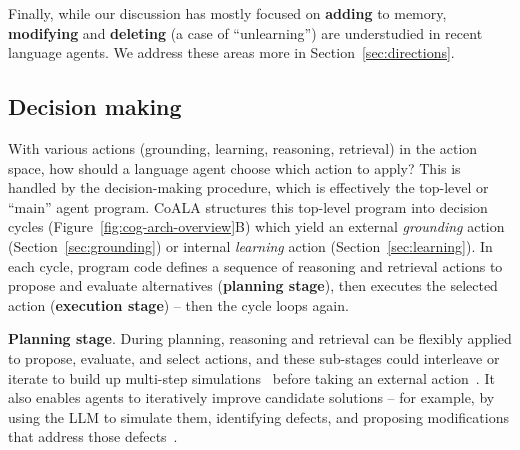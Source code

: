 \documentclass[10pt]{article} %
\begin{document}
Finally, while our discussion has mostly focused on \textbf{adding} to memory, \textbf{modifying} and \textbf{deleting} (a case of ``unlearning'') are understudied in recent language agents. We address these areas more in Section~\ref{sec:directions}. 

\subsection{Decision making}
\label{sec:decision}

With various actions (grounding, learning, reasoning, retrieval) in the action space, how should a language agent choose which action to apply?
This is handled by the decision-making procedure, which is effectively the top-level or ``main'' agent program. CoALA structures this top-level program into decision cycles (Figure~\ref{fig:cog-arch-overview}B) which yield an external \emph{grounding} action (Section~\ref{sec:grounding}) or internal \emph{learning} action (Section~\ref{sec:learning}). In each cycle, program code defines a sequence of reasoning and retrieval actions to propose and evaluate alternatives (\textbf{planning stage}), then executes the selected action (\textbf{execution stage}) -- then the cycle loops again.


\textbf{Planning stage}. During planning, reasoning and retrieval can be flexibly applied to propose, evaluate, and select actions, and these sub-stages could interleave or iterate to build up multi-step simulations~\citep{tamari2020language} before taking an external action~\citep{yao2023tree, hao2023reasoning}. It also enables agents to iteratively improve candidate solutions -- for example, by using the LLM to simulate them, identifying defects, and proposing modifications that address those defects~\citep{kirk2023improving, shinn2023reflexion}.
\end{document}
